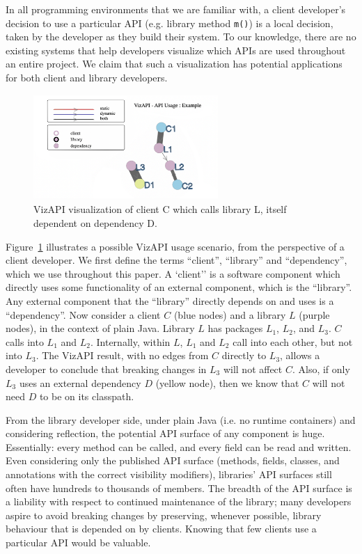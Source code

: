 In all programming environments that we are familiar with, a client developer's decision to use a particular API (e.g. library method {\tt m()}) is a local decision, taken by the developer as they build their system. To our knowledge, there are no existing systems that help developers visualize which APIs are used throughout an entire project. We claim that such a visualization has potential applications for both client and library developers.
\begin{figure}[h]
\begin{center}
\includegraphics[height=4cm,width=7cm]{images/intro-example.png}
\caption{VizAPI visualization of client C which calls library L, itself dependent on dependency D.}
\label{fig:example}
\end{center}
\end{figure}


Figure~\ref{fig:example} illustrates a possible VizAPI usage scenario, from the perspective of a client developer. We first define the terms ``client'', ``library'' and ``dependency'', which we use throughout this paper. A `client'' is a software component which directly uses some functionality of an external component, which is the ``library''. Any external component that the ``library'' directly depends on and uses is a ``dependency''. Now consider a client $C$ (blue nodes) and a library $L$ (purple nodes), in the context of plain Java. Library $L$ has packages $L_1$, $L_2$, and $L_3$. $C$ calls into $L_1$ and $L_2$. Internally, within $L$, $L_1$ and $L_2$ call into each other, but not into $L_3$. The VizAPI result, with no edges from $C$ directly to $L_3$, allows a developer to conclude that breaking changes in $L_3$ will not affect $C$. Also, if only $L_3$ uses an external dependency $D$ (yellow node), then we know that $C$ will not need $D$ to be on its classpath.

From the library developer side, under plain Java (i.e. no runtime containers) and considering reflection, the potential API surface of any component is huge. Essentially: every method can be called, and every field can be read and written. Even considering only the published API surface (methods, fields, classes, and annotations with the correct visibility modifiers), libraries' API surfaces still often have hundreds to thousands of members. The breadth of the API surface is a liability with respect to continued maintenance of the library; many developers aspire to avoid breaking changes by preserving, whenever possible, library behaviour that is depended on by clients. Knowing that few clients use a particular API would be valuable.

